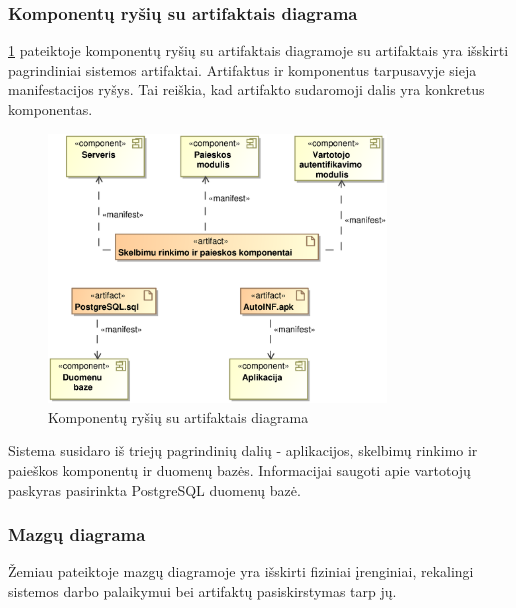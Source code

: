 \documentclass[12pt]{article}
\begin{document}
	\subsubsection{Komponentų ryšių su artifaktais diagrama}
	
	\ref{ArtComp} pateiktoje komponentų ryšių su artifaktais diagramoje su artifaktais yra išskirti pagrindiniai sistemos artifaktai. Artifaktus ir komponentus tarpusavyje sieja manifestacijos ryšys. Tai reiškia, kad artifakto sudaromoji dalis yra konkretus komponentas.
	
	\begin{figure}[h]
		\begin{center}
			\includegraphics[width=0.8\textwidth]{ArtifaktaiKomponentai.eps}
			\caption{Komponentų ryšių su artifaktais diagrama\label{ArtComp}}
		\end{center}
	\end{figure}

	Sistema susidaro iš triejų pagrindinių dalių - aplikacijos, skelbimų rinkimo ir paieškos komponentų ir duomenų bazės. Informacijai saugoti apie vartotojų paskyras pasirinkta PostgreSQL duomenų bazė.
	\pagebreak
	
	\subsubsection{Mazgų diagrama}
	
	Žemiau pateiktoje mazgų diagramoje yra išskirti fiziniai įrenginiai, rekalingi sistemos darbo palaikymui bei artifaktų pasiskirstymas tarp jų.\\
	
\end{document}
